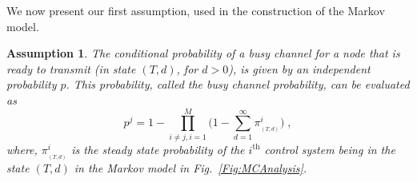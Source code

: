 \documentclass[twocolumn]{autart}
\newtheorem{assumption}{Assumption}[section]
\begin{document}
\begin{figure*}[tb]
\begin{center}
 \caption{A Markov chain representation for the event-triggering policy in (\ref{Eq:InnoSched}) and $p$-persistent CSMA with no retransmissions. }
\label{Fig:MCAnalysis}
\end{center}
\end{figure*}

We now present our first assumption, used in the construction of the Markov model.
\begin{assumption}\textbf{} \label{Assume:Bianchi}
The conditional probability of a busy channel for a node that is ready to transmit (in state $(T,d)$, for $d > 0$), is given by an independent probability $p$. This probability, called the busy channel probability, can be evaluated as
\begin{equation} \label{Eq:pBianchi}
p^{j} = 1 - \prod_{i \neq j, i = 1} ^{M} \big( 1- \sum_{d=1}^{\infty} \pi^{i}_{_{(T,d)}} \big) \; ,
\end{equation}
where, $\pi^{i}_{_{(T,d)}}$ is the steady state probability of the $i^{\textrm{th}}$ control system being in the state $(T,d)$ in the Markov model in Fig.~\ref{Fig:MCAnalysis}.
\end{assumption}
\end{document}
